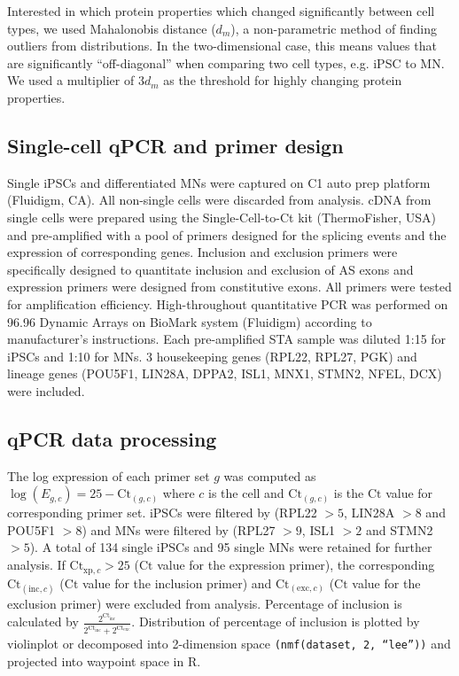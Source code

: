 Interested in which protein properties which changed significantly between cell types, we used Mahalonobis distance \cite{DeMaesschalck:2000hv} ($d_m$), a non-parametric method of finding outliers from distributions. In the two-dimensional case, this means values that are significantly ``off-diagonal'' when comparing two cell types, e.g. iPSC to MN. We used a multiplier of $3d_m$ as the threshold for highly changing protein properties.

\subsection{Single-cell qPCR and primer design}

Single iPSCs and differentiated MNs were captured on C1 auto prep platform (Fluidigm, CA). All non-single cells were discarded from analysis. cDNA from single cells were prepared using the Single-Cell-to-Ct kit (ThermoFisher, USA) and pre-amplified with a pool of primers designed for the splicing events and the expression of corresponding genes. Inclusion and exclusion primers were specifically designed to quantitate inclusion and exclusion of AS exons and expression primers were designed from constitutive exons. All primers were tested for amplification efficiency. High-throughout quantitative PCR was performed on 96.96 Dynamic Arrays on BioMark system (Fluidigm) according to manufacturer's instructions. Each pre-amplified STA sample was diluted 1:15 for iPSCs and 1:10 for MNs. 3 housekeeping genes (RPL22, RPL27, PGK) and lineage genes (POU5F1, LIN28A, DPPA2, ISL1, MNX1, STMN2, NFEL, DCX) were included. %

\subsection{qPCR data processing}

The log expression of each primer set $g$ was computed as $\log(E_{g,c}) = 25 - \mathrm{Ct}_{(g,c)}$ where $c$ is the cell and $\mathrm{Ct}_{(g,c)}$ is the $\mathrm{Ct}$ value for corresponding primer set. iPSCs were filtered by (RPL22 $>5$, LIN28A $> 8$ and POU5F1 $> 8$) and MNs were filtered by (RPL27 $> 9$, ISL1 $> 2$ and STMN2 $> 5$). A total of 134 single iPSCs and 95 single MNs were retained for further analysis. If $\mathrm{Ct}_{\mathrm{xp},c}  > 25$ ($\mathrm{Ct}$ value for the expression primer), the corresponding $\mathrm{Ct}_{(\mathrm{inc},c)}$ ($\mathrm{Ct}$ value for the inclusion primer) and $\mathrm{Ct}_{(\mathrm{exc},c)}$ ($\mathrm{Ct}$ value for the exclusion primer) were excluded from analysis. Percentage of inclusion is calculated by $\frac{2^{\mathrm{Ct}_{\mathrm{inc}}}}{2^{\mathrm{Ct}_{\mathrm{inc}}} +2^{\mathrm{Ct}_{\mathrm{exc}}}}$. Distribution of percentage of inclusion is plotted by violinplot or decomposed into 2-dimension space \texttt{(nmf(dataset, 2, ``lee''))} and projected into waypoint space in R.

